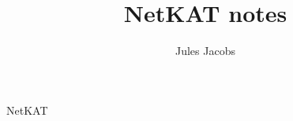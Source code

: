 \documentclass[a4paper, 11pt]{scrartcl}
\title{NetKAT notes}
\author{Jules Jacobs}
\begin{document}
\maketitle

NetKAT
\end{document}
